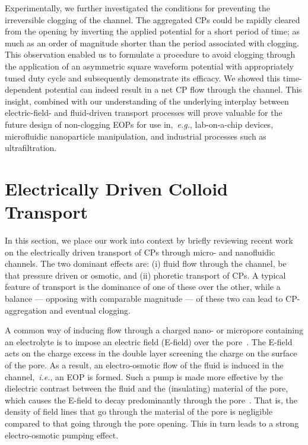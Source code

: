 \documentclass[twoside,twocolumn,9pt]{article}
\begin{document}
Experimentally, we further investigated the conditions for preventing the irreversible clogging of the channel. 
The aggregated CPs could be rapidly cleared from the opening by inverting the applied potential for a short period of time; as much as an order of magnitude shorter than the period associated with clogging. 
This observation enabled us to formulate a procedure to avoid clogging through the application of an asymmetric square waveform potential with appropriately tuned duty cycle and subsequently demonstrate its efficacy. 
We showed this time-dependent potential can indeed result in a net CP flow through the channel. 
This insight, combined with our understanding of the underlying interplay between electric-field- and fluid-driven transport processes will prove valuable for the future design of non-clogging EOPs for use in,~\textit{e.g.}, lab-on-a-chip devices, microfluidic nanoparticle manipulation, and industrial processes such as ultrafiltration.

\section*{Electrically Driven Colloid Transport}

In this section, we place our work into context by briefly reviewing recent work on the electrically driven transport of CPs through micro- and nanofluidic channels. The two dominant effects are: (i) fluid flow through the channel, be that pressure driven or osmotic, and (ii) phoretic transport of CPs. A typical feature of transport is the dominance of one of these over the other, while a balance --- opposing with comparable magnitude --- of these two can lead to CP-aggregation and eventual clogging.

A common way of inducing flow through a charged nano- or micropore containing an electrolyte is to impose an electric field (E-field) over the pore~\cite{LI20191}. 
The E-field acts on the charge excess in the double layer screening the charge on the surface of the pore. 
As a result, an electro-osmotic flow of the fluid is induced in the channel,~\textit{i.e.}, an EOP is formed. 
Such a pump is made more effective by the dielectric contrast between the fluid and the (insulating) material of the pore, which causes the E-field to decay predominantly through the pore~\cite{yangElectroosmoticFlowMicrochannels2001}. 
That is, the density of field lines that go through the material of the pore is negligible compared to that going through the pore opening. 
This in turn leads to a strong electro-osmotic pumping effect.
\end{document}
